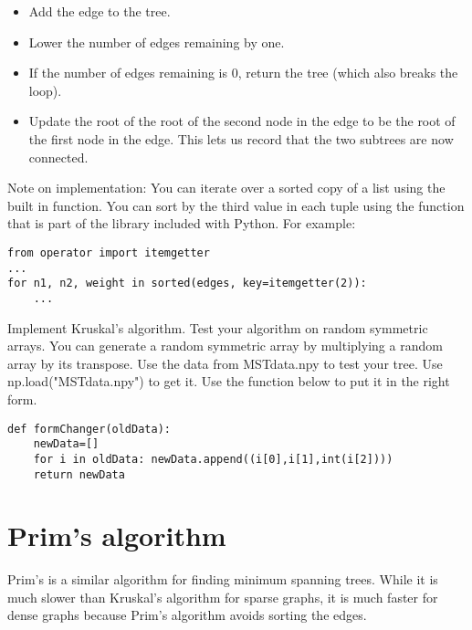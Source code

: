 \begin{itemize}
\begin{itemize}
		\begin{itemize}

		\item Add the edge to the tree.

		\item Lower the number of edges remaining by one.

		\item If the number of edges remaining is 0, return the tree (which also breaks the loop).

		\item Update the root of the root of the second node in the edge to be the root of the first node in the edge.
			This lets us record that the two subtrees are now connected.

		\end{itemize}

	\end{itemize}

\end{itemize}
Note on implementation: You can iterate over a sorted copy of a list using the built in  function.
You can sort by the third value in each tuple using the  function that is part of the  library included with Python.
For example:
\begin{lstlisting}
from operator import itemgetter
...
for n1, n2, weight in sorted(edges, key=itemgetter(2)):
    ...
\end{lstlisting}

\begin{problem}
Implement Kruskal's algorithm.
Test your algorithm on random symmetric arrays.
You can generate a random symmetric array by multiplying a random array by its transpose.
Use the data from MSTdata.npy to test your tree.
Use np.load("MSTdata.npy") to get it.
Use the  function below to put it in the right form.
\begin{lstlisting}
def formChanger(oldData):
    newData=[] 
    for i in oldData: newData.append((i[0],i[1],int(i[2])))
    return newData
\end{lstlisting}
\end{problem}
\section*{Prim's algorithm}

Prim's is a similar algorithm for finding minimum spanning trees.
While it is much slower than Kruskal's algorithm for sparse graphs, it is much faster for dense graphs because Prim's algorithm avoids sorting the edges.


